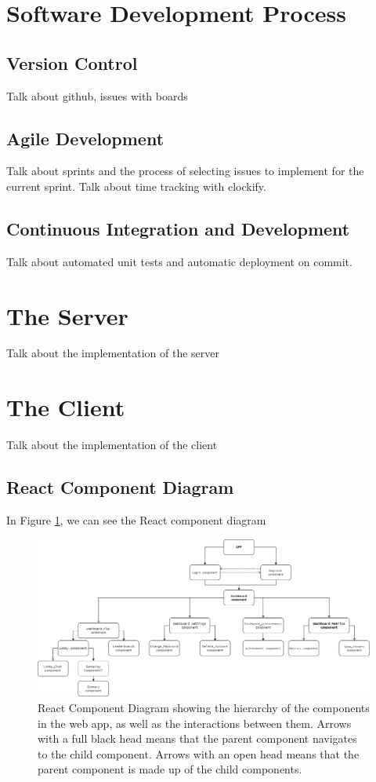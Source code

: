 \documentclass{l4proj}
\begin{document}
\section{Software Development Process}
\subsection{Version Control}
Talk about github, issues with boards

\subsection{Agile Development}
Talk about sprints and the process of selecting issues to implement for the current sprint. Talk about time tracking with clockify.

\subsection{Continuous Integration and Development}
Talk about automated unit tests and automatic deployment on commit.

\section{The Server}
Talk about the implementation of the server

\section{The Client}
Talk about the implementation of the client

\subsection{React Component Diagram}
In Figure \ref{fig:react}, we can see the React component diagram
\begin{figure}
    \centering
    \includegraphics[width=1\linewidth]{images/react_comp_diagram.png}    

    \caption{React Component Diagram showing the hierarchy of the components in the web app, as well as the interactions between them. Arrows with a full black head means that the parent component navigates to the child component. Arrows with an open head means that the parent component is made up of the child components.}

    \label{fig:react} 
\end{figure}
\end{document}
